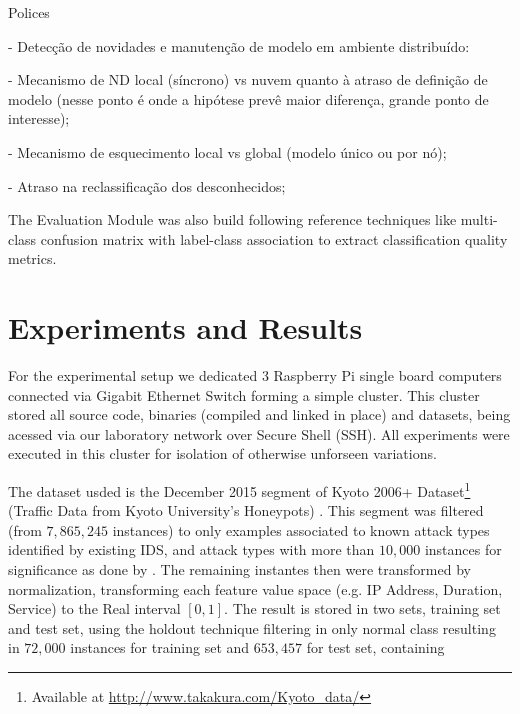 \documentclass[conference]{IEEEtran}
\begin{document}
Polices

- Detecção de novidades e manutenção de modelo em ambiente distribuído:

  - Mecanismo de ND local (síncrono) vs nuvem quanto à atraso de definição de modelo
    (nesse ponto é onde a hipótese prevê maior diferença, grande ponto de interesse);

  - Mecanismo de esquecimento local vs global (modelo único ou por nó);

  - Atraso na reclassificação dos desconhecidos;


The Evaluation Module was also build following reference techniques like
multi-class confusion matrix with label-class association
\cite{Faria2016minas}
to extract classification quality metrics.

\section{Experiments and Results}\label{sec:experiments}

For the experimental setup we dedicated 3 Raspberry Pi single board computers
connected via Gigabit Ethernet Switch forming a simple cluster.
This cluster stored all source code, binaries (compiled and linked in place) and
datasets, being acessed via our laboratory network over Secure Shell (SSH).
All experiments were executed in this cluster for isolation of otherwise unforseen
variations.

The dataset usded is the December 2015 segment of
Kyoto 2006+ Dataset\footnote{Available at \url{http://www.takakura.com/Kyoto_data/}}
(Traffic Data from Kyoto University's Honeypots)
\cite{Song2011}.
This segment was filtered (from $7,865,245$ instances) to only examples
associated to known attack types identified by existing IDS, and attack types
with more than $10,000$ instances for significance as done by \cite{Cassales2019a}.
The remaining instantes then were transformed by normalization, transforming
each feature value space (e.g. IP Address, Duration, Service) to the
Real interval $[0, 1]$.
The result is stored in two sets, training set and test set, using the holdout technique
filtering in only normal class
resulting in $72,000$ instances for training set and $653,457$ for test set,
containing 
\end{document}
